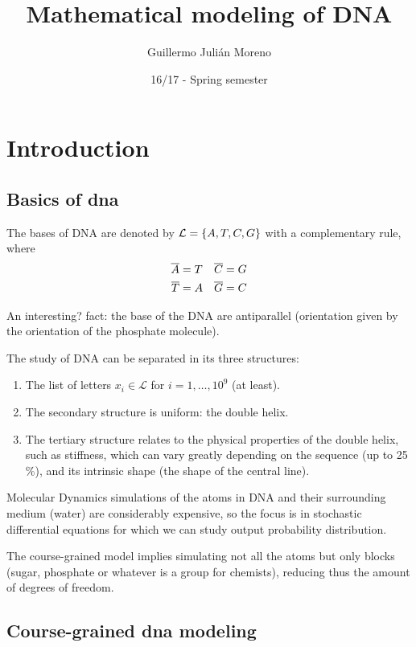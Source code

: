 \documentclass[palatino]{epflnotes}
\title{Mathematical modeling of DNA}
\author{Guillermo Julián Moreno}
\date{16/17 - Spring semester}
\begin{document}
\frontmatter
\pagestyle{plain}
\maketitle

\tableofcontents
\mainmatter

\chapter{Introduction}

\section{Basics of dna}

The bases of DNA are denoted by $\mathcal{L} = \set{A,T,C,G}$ with a complementary  rule, where \begin{align*}
\overline{A} &= T &\overline{C} &= G \\
\overline{T} &= A &\overline{G} &= C
\end{align*}

An interesting? fact: the base of the DNA are antiparallel (orientation given by the orientation of the phosphate molecule).

The study of DNA can be separated in its three structures:
\begin{enumerate}
	\item The list of letters $x_i ∈ \mathcal{L} $ for $i = 1, \dotsc, 10^9$ (at least).
	\item The secondary structure is uniform: the double helix.
	\item The tertiary structure relates to the physical properties of the double helix, such as stiffness, which can vary greatly depending on the sequence (up to 25 \%), and its intrinsic shape (the shape of the central line).
\end{enumerate}

Molecular Dynamics simulations of the atoms in DNA and their surrounding medium (water) are considerably expensive, so the focus is in stochastic differential equations for which we can study output probability distribution.

The course-grained model implies simulating not all the atoms but only blocks (sugar, phosphate or whatever is a group for chemists), reducing thus the amount of degrees of freedom.

\section{Course-grained dna modeling}
\end{document}
